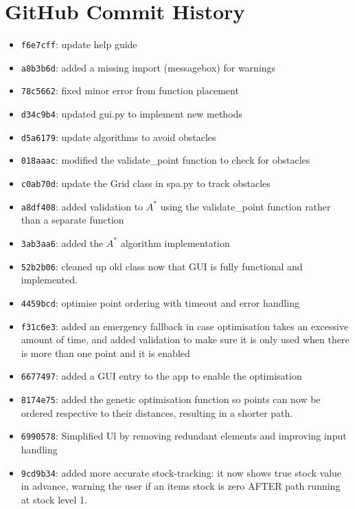 \chapter{GitHub Commit History}

\begin{itemize}
	\item \texttt{f6e7cff}: update help guide
	\item \texttt{a8b3b6d}: added a missing import (messagebox) for warnings
	\item \texttt{78c5662}: fixed minor error from function placement
	\item \texttt{d34c9b4}: updated gui.py to implement new methods
	\item \texttt{d5a6179}: update algorithms to avoid obstacles
	\item \texttt{018aaac}: modified the validate\_point function to check for obstacles
	\item \texttt{c0ab70d}: update the Grid class in spa.py to track obstacles
	\item \texttt{a8df408}: added validation to $A^{*}$ using the validate\_point function rather than a separate function
	\item \texttt{3ab3aa6}: added the $A^{*}$ algorithm implementation
	\item \texttt{52b2b06}: cleaned up old class now that GUI is fully functional and implemented.
	\item \texttt{4459bcd}: optimise point ordering with timeout and error handling
	\item \texttt{f31c6e3}: added an emergency fallback in case optimisation takes an excessive amount of time, and added validation to make sure it is only used when there is more than one point and it is enabled
	\item \texttt{6677497}: added a GUI entry to the app to enable the optimisation
	\item \texttt{8174e75}: added the genetic optimisation function so points can now be ordered respective to their distances, resulting in a shorter path.
	\item \texttt{6990578}: Simplified Ul by removing redundant elements and improving input handling
	\item \texttt{9cd9b34}: added more accurate stock-tracking: it now shows true stock value in advance, warning the user if an items stock is zero AFTER path running at stock level 1.

\end{itemize}
